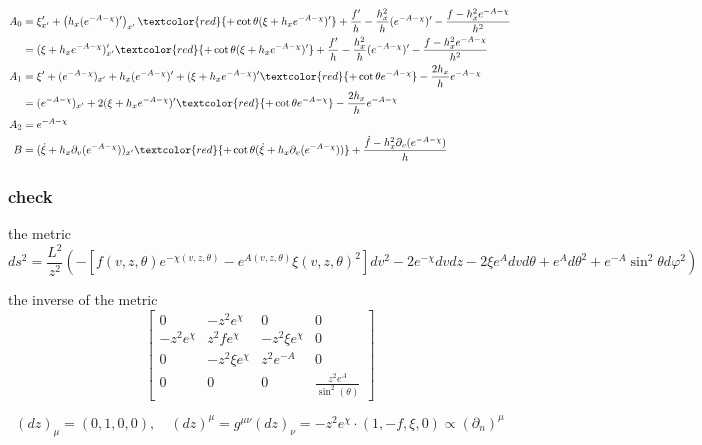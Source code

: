 \documentclass[12pt,a4paper]{ctexart}
\numberwithin{equation}{section}
\begin{document}
\begin{equation}
    \begin{aligned}
        A_0&=\xi'_{x'}+\left(h_x(e^{-A-\chi})'\right)_{x'}\textcolor{red}{+\cot\theta(\xi+h_{x}e^{-A-\chi})'}+\frac{f'}{h}-\frac{h_x^2}{h}(e^{-A-\chi})'-\frac{f-h_x^2 e^{-A-\chi}}{h^2}\\
        &=(\xi+h_x e^{-A-\chi})'_{x'}\textcolor{red}{+\cot\theta(\xi+h_{x}e^{-A-\chi})'}+\frac{f'}{h}-\frac{h_x^2}{h}(e^{-A-\chi})'-\frac{f-h_x^2 e^{-A-\chi}}{h^2}\\
        A_1&=\xi'+(e^{-A-\chi})_{x'}+h_x(e^{-A-\chi})'+(\xi+h_x e^{-A-\chi})'\textcolor{red}{+\cot\theta e^{-A-\chi}}-\frac{2h_x}{h}e^{-A-\chi}\\
        &=(e^{-A-\chi})_{x'}+2(\xi+h_x e^{-A-\chi})'\textcolor{red}{+\cot\theta e^{-A-\chi}}-\frac{2h_x}{h}e^{-A-\chi}\\
        A_2&=e^{-A-\chi}\\
        B&=(\dot{\xi}+h_x\partial_v(e^{-A-\chi}))_{x'}\textcolor{red}{+\cot\theta(\dot{\xi}+h_x\partial_v(e^{-A-\chi}))}+\frac{\dot{f}-h_x^2\partial_v(e^{-A-\chi})}{h}
    \end{aligned}
\end{equation}

\subsubsection{check}
the metric
\begin{equation}
    ds^2=\frac{L^2}{z^2}(-[f(v,z,\theta)e^{-\chi(v,z,\theta)}-e^{A(v,z,\theta)}\xi(v,z,\theta)^2]dv^2-2e^{-\chi}dvdz-2\xi e^Advd\theta+e^Ad\theta^2+e^{-A}\sin^2\theta d\varphi^2)
\end{equation}

the inverse of the metric
\begin{equation}
    \left[\begin{matrix}
        0 & - z^{2} e^{\chi} & 0 & 0\\- z^{2} e^{\chi} & z^{2} f e^{\chi} & - z^{2} \xi e^{\chi} & 0\\0 & - z^{2} \xi e^{\chi} & z^{2} e^{- A} & 0\\0 & 0 & 0 & \frac{z^{2} e^{A}}{\sin^{2}{\left(\theta \right)}}
    \end{matrix}\right]
\end{equation}

\begin{equation}
    (dz)_\mu=(0,1,0,0),\quad(dz)^\mu=g^{\mu\nu}(dz)_\nu=-z^2 e^{\chi}\cdot(1,-f,\xi,0)\propto(\partial_n)^\mu
\end{equation}
\end{document}
